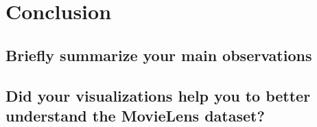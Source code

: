 \section{Conclusion}
\medskip
\subsection{Briefly summarize your main observations}
\subsection{Did your visualizations help you to better understand the MovieLens dataset?}





\noindent

